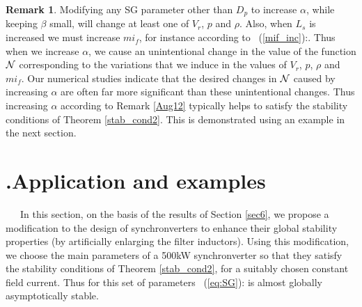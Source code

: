 \documentclass[12pt]{article}
\theoremstyle{definition}
\newtheorem{remark}[theorem]{Remark}
\numberwithin{equation}{section}                        %
\newcommand{\rfb}[1]{\mbox{\rm
   (\ref{#1})}\ifx\undefined\stillediting\else:\fbox{$#1$}\fi}
\newcommand{\Nscr} {{\cal N}}
\newcommand{\secp}{{\hbox{\hskip -7mm.\hskip 4mm}}}
\let\oldlabel=\label
\renewcommand{\label}[1]{\leavevmode\smash{\raise 10pt\llap
             {\fbox{\scriptsize#1}}}\oldlabel{#1}}
\renewcommand{\label}[1]{\oldlabel{#1}}
\begin{document}
\begin{remark} \label{other_factors}
Modifying any SG parameter other than $D_p$ to increase $\alpha$,
while keeping $\beta$ small, will change at least one of $V_r$, $p$
and $\rho$. Also, when $L_s$ is increased we must increase $mi_f$,
for instance according to \rfb{mif_inc}. Thus when we increase
$\alpha$, we cause an unintentional change in the value of the
function $\Nscr$ corresponding to the variations that we induce in
the values of $V_r$, $p$, $\rho$ and $mi_f$. Our numerical studies
indicate that the desired changes in $\Nscr$ caused by increasing
$\alpha$ are often far more significant than these unintentional
changes. Thus increasing $\alpha$ according to Remark \ref{Aug12}
typically helps to satisfy the stability conditions of Theorem
\ref{stab_cond2}. This is demonstrated using an example in the next
section.
\end{remark}

\section{\secp Application and examples} \label{sec7} %

\ \ \ In this section, on the basis of the results of Section
\ref{sec6}, we propose a modification to the design of synchronverters
to enhance their global stability properties (by artificially
enlarging the filter inductors). Using this modification, we choose
the main parameters of a 500kW synchronverter so that they satisfy the
stability conditions of Theorem \ref{stab_cond2}, for a suitably
chosen constant field current. Thus for this set of parameters
\rfb{eq:SG} is almost globally asymptotically stable.
\end{document}

